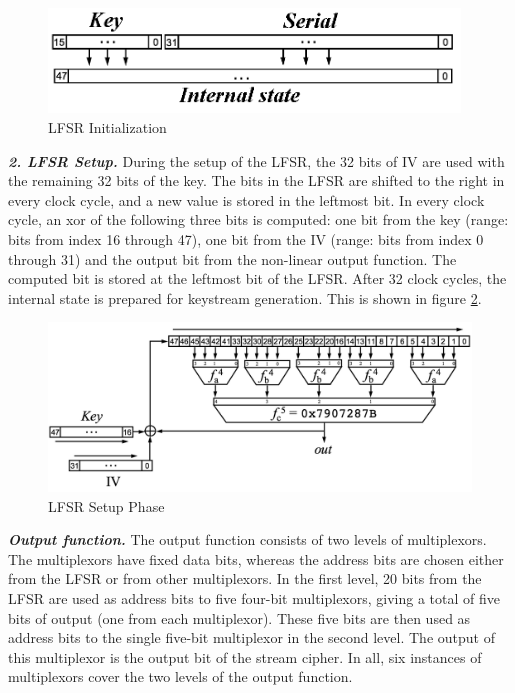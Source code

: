 \begin{figure}[ht!]
	\centering
		\includegraphics[width=4.3in]{./figures/hitag2-1.PNG}
	\caption{LFSR Initialization \cite{hitag2-figure}}	
	\label{fig:hitag2-1}
\end{figure}

\noindent \textit{\textbf{2. LFSR Setup.}} During the setup of the LFSR, the 32 bits of IV are used with the remaining 32 bits of the key. The bits in the LFSR are shifted to the right in every clock cycle, and a new value is stored in the leftmost bit. In every clock cycle, an xor of the following three bits is computed: one bit from the key (range: bits from index 16 through 47), one bit from the IV (range: bits from index 0 through 31) and the output bit from the non-linear output function. The computed bit is stored at the leftmost bit of the LFSR. After 32 clock cycles, the internal state is prepared for keystream generation. This is shown in figure \ref{fig:hitag2-2}.\\

\begin{figure}[ht!]
	\centering
		\includegraphics[width=5.5in]{./figures/hitag2-2.PNG}
	\caption{LFSR Setup Phase \cite{hitag2-figure}}	
	\label{fig:hitag2-2}
\end{figure}

\noindent \textit{\textbf{Output function.}} The output function consists of two levels of multiplexors. The multiplexors have fixed data bits, whereas the address bits are chosen either from the LFSR or from other multiplexors. In the first level, 20 bits from the LFSR are used as address bits to five four-bit multiplexors, giving a total of five bits of output (one from each multiplexor). These five bits are then used as address bits to the single five-bit multiplexor in the second level. The output of this multiplexor is the output bit of the stream cipher. In all, six instances of multiplexors cover the two levels of the output function.

